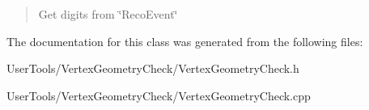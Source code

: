 \begin{quotation}
Get digits from \char`\"{}\-Reco\-Event\char`\"{} \end{quotation}


The documentation for this class was generated from the following files\-:\begin{DoxyCompactItemize}
\item 
User\-Tools/\-Vertex\-Geometry\-Check/Vertex\-Geometry\-Check.\-h\item 
User\-Tools/\-Vertex\-Geometry\-Check/Vertex\-Geometry\-Check.\-cpp\end{DoxyCompactItemize}
